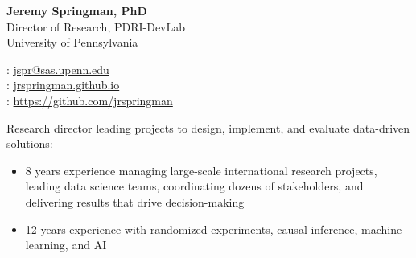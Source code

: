 \documentclass[11pt]{article}
\renewcommand{\today}{\monthname[\the\month] \the\year}
\begin{document}
\thispagestyle{empty}



\begin{multicols}{2}
{\Large {\bf Jeremy Springman, PhD}}\\
Director of Research, PDRI-DevLab\\
University of Pennsylvania\\

\columnbreak
\begin{flushright}

\faEnvelope: \href{mailto:jspr@sas.upenn.edu}{jspr@sas.upenn.edu}\\
\faLaptop: \url{jrspringman.github.io}\\
\faGithub: \url{https://github.com/jrspringman}\\
\end{flushright}
\end{multicols}
\vspace{-10pt}

Research director leading projects to design, implement, and evaluate data-driven solutions:
\begin{itemize}[itemsep=0mm, parsep=0pt]
\item 8 years experience managing large-scale international research projects, leading data science teams, coordinating dozens of stakeholders, and delivering results that drive decision-making
\item 12 years experience with randomized experiments, causal inference, machine learning, and AI 
\end{itemize}
\end{document}
